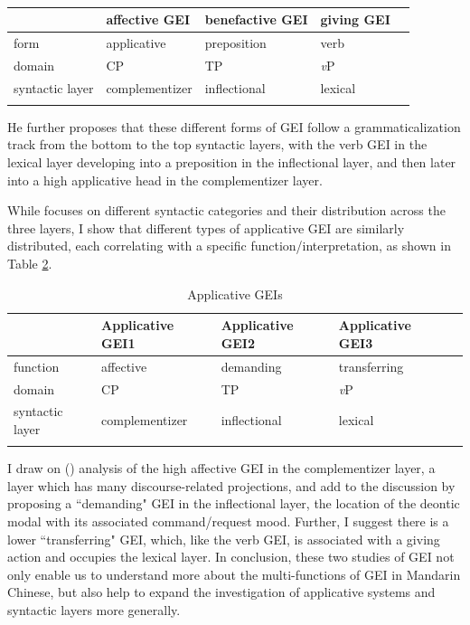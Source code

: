 \documentclass[output=paper,colorlinks,citecolor=brown]{langscibook}
\begin{document}
\begin{table}
\caption{\citet{Tsai2017}}
\label{kuotab:2:different}
 \begin{tabular}{lllll} 
  \lsptoprule
            & affective GEI & benefactive GEI & giving GEI\\ 
  \midrule
  form  &   applicative &    preposition  &   verb\\
  domain & CP & TP & \textit{v}P\\
  syntactic layer  & complementizer & inflectional & lexical\\
  \lspbottomrule
 \end{tabular}
\end{table}

He further proposes that these different forms of GEI follow a grammaticalization track from the bottom to the top syntactic layers, with the verb GEI in the lexical layer developing into a preposition in the inflectional layer, and then later into a high applicative head in the complementizer layer. 
 
While \citet{Tsai2017} focuses on different syntactic categories and their distribution across the three layers, I show that different types of applicative GEI are similarly distributed, each correlating with a specific function/interpretation, as shown in Table \ref{kuotab:3:different2}.

\begin{table}
\caption{Applicative GEIs}
\label{kuotab:3:different2}
 \begin{tabular}{lllll} 
  \lsptoprule
            & Applicative GEI1 & Applicative GEI2 & Applicative GEI3\\ 
  \midrule
  function & affective & demanding & transferring\\
  domain & CP & TP & \textit{v}P\\
  syntactic layer  & complementizer & inflectional & lexical\\
  \lspbottomrule
 \end{tabular}
\end{table}

I draw on  (\citeyear{Tsai2017}) analysis of the high affective GEI in the complementizer layer, a layer which has many discourse-related projections, and add to the discussion by proposing a “demanding" GEI in the inflectional layer, the location of the deontic modal with its associated command/request mood. Further, I suggest there is a lower “transferring" GEI, which, like the verb GEI, is associated with a giving action and occupies the lexical layer. In conclusion, these two studies of GEI not only enable us to understand more about the multi-functions of GEI in Mandarin Chinese, but also help to expand the investigation of applicative systems and syntactic layers more generally.
\end{document}
